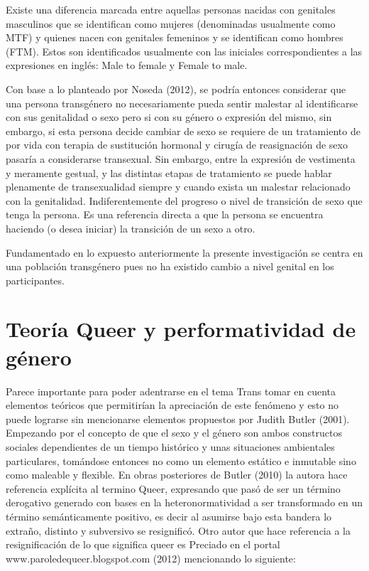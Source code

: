 Existe una diferencia marcada entre aquellas personas nacidas con genitales
masculinos que se identifican como mujeres (denominadas usualmente como MTF) y
quienes nacen con genitales femeninos y se identifican como hombres (FTM).
Estos son identificados usualmente con las iniciales correspondientes a las
expresiones en inglés: Male to female y Female to male.

Con base a lo planteado por Noseda (2012), se podría entonces considerar que una
persona transgénero no necesariamente pueda sentir malestar al identificarse con
sus genitalidad o sexo pero si con su género o expresión del mismo, sin embargo,
si esta persona decide cambiar de sexo se requiere de un tratamiento de por vida
con terapia de sustitución hormonal y cirugía de reasignación de sexo pasaría a
considerarse transexual.
Sin embargo, entre la expresión de vestimenta y meramente gestual, y las
distintas etapas de tratamiento se puede hablar plenamente de transexualidad
siempre y cuando exista un malestar relacionado con la genitalidad.
Indiferentemente del progreso o nivel de transición de sexo que tenga la
persona.
Es una referencia directa a que la persona se encuentra haciendo (o desea
iniciar) la transición de un sexo a otro.

Fundamentado en lo expuesto anteriormente la presente investigación se centra en
una población transgénero pues no ha existido cambio a nivel genital en los
participantes.

\section{Teoría Queer y performatividad de género}
Parece importante para poder adentrarse en el tema Trans tomar en cuenta
elementos teóricos que permitirían la apreciación de este fenómeno y esto no
puede lograrse sin mencionarse elementos propuestos por Judith Butler (2001).
Empezando por el concepto de que el sexo y el género son ambos constructos
sociales dependientes de un tiempo histórico y unas situaciones ambientales
particulares, tomándose entonces no como un elemento estático e inmutable sino
como maleable y flexible.
En obras posteriores de Butler (2010) la autora hace referencia explícita al
termino Queer, expresando que pasó de ser un término derogativo generado con
bases en la heteronormatividad a ser transformado en un término semánticamente
positivo, es decir al asumirse bajo esta bandera lo extraño, distinto y
subversivo se resignificó.
Otro autor que hace referencia a la resignificación de lo que significa queer es
Preciado en el portal www.paroledequeer.blogspot.com (2012) mencionando lo
siguiente:

